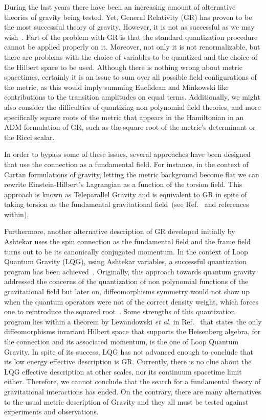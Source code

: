 \documentclass[twocolumn,aps,
  showpacs,showkeys,prd,superscriptaddress]{revtex4-1}
\begin{document}
During the last years there have been an increasing amount of alternative theories of gravity being tested. Yet, General Relativity (GR) has proven to be the most successful theory of gravity.  However,  it is not as successful as we may wish~\cite{Kiefer:2013jqa}. Part of the problem with GR is that the standard quantization procedure cannot be applied  properly on it. Moreover, not only it is not renormalizable, but there are  problems with the choice of variables to be quantized and the choice of the Hilbert space to be used. Although there is nothing wrong about metric spacetimes,  certainly it is an issue to sum over all possible field configurations of the metric, as this would imply summing Euclidean and Minkowski like contributions to the transition amplitudes on equal terms. Additionally, we might also consider the difficulties of  quantizing  non polynomial field theories, and more specifically square roots of the metric that appears in the Hamiltonian in an ADM formulation of GR, such as the square root of the metric's determinant or the Ricci scalar.

In order to bypass some of these issues, several approaches have been designed that use the connection as a fundamental field. For instance, in the context of Cartan formulations of gravity, letting the metric background become flat we can rewrite Einstein-Hilbert's Lagrangian as a function of the torsion field. This approach is known as Teleparallel Gravity and is equivalent to GR in spite of taking torsion as the fundamental gravitational field~(see Ref.~\cite{Teleparallel} and references within).

Furthermore, another alternative description of GR developed initially by Ashtekar uses the spin connection as the fundamental field and the frame field turns out to be its canonically conjugated momentum. In the context of Loop Quantum Gravity (LQG), using Ashtekar variables, a successful quantization program has been achieved~\cite{Ashtekar:2004eh,thiemann2007loop}. Originally, this approach towards quantum gravity addressed the concerns of the quantization of non polynomial functions of the gravitational field but later on, diffeomorphisms symmetry would not show up when the quantum operators were not of the correct density weight, which forces one to reintroduce the squared root~\cite{Thiemann:1996aw}.  Some  strengths of this quantization program lies within a theorem by Lewandowski \emph{et al.} in Ref.~\cite{Lewandowski:2005jk} that states the only diffeomorphisms invariant Hilbert space that supports the Heisenberg algebra, for the connection and its associated momentum, is the one of Loop Quantum Gravity. In spite of its success, LQG has not advanced enough to conclude that its low energy effective description is GR. Currently, there is no clue about the LQG effective description at other scales,  nor its continuum spacetime limit either. Therefore, we cannot conclude that the search for a fundamental theory of gravitational interactions has ended. On the contrary, there are many alternatives to the usual metric description of Gravity and they all must be tested against experiments and observations.
\end{document}
